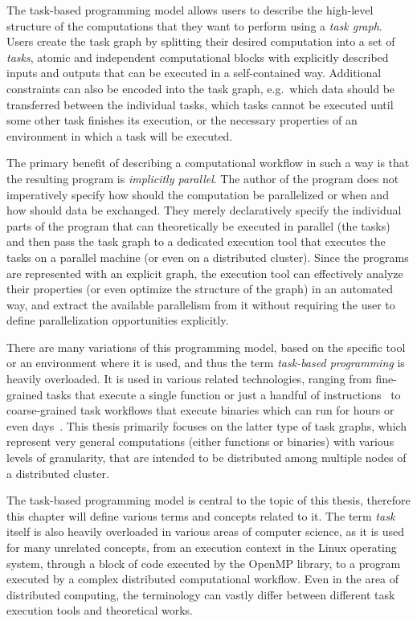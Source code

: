
The task-based programming model allows users to describe the high-level structure of the
computations that they want to perform using a \emph{task graph}. Users create the task graph
by splitting their desired computation into a set of \emph{tasks}, atomic and independent
computational blocks with explicitly described inputs and outputs that can be executed in a
self-contained way. Additional constraints can also be encoded into the task graph, e.g.\ which
data should be transferred between the individual tasks, which tasks cannot be executed until some
other task finishes its execution, or the necessary properties of an environment in which a task
will be executed.

The primary benefit of describing a computational workflow in such a way is that the resulting
program is \emph{implicitly parallel}. The author of the program does not imperatively specify how
should the computation be parallelized or when and how should data be exchanged. They merely
declaratively specify the individual parts of the program that can theoretically be executed in
parallel (the tasks) and then pass the task graph to a dedicated execution tool that executes the
tasks on a parallel machine (or even on a distributed cluster). Since the programs are represented
with an explicit graph, the execution tool can effectively analyze their properties (or even
optimize the structure of the graph) in an automated way, and extract the available parallelism
from it without requiring the user to define parallelization opportunities explicitly.

There are many variations of this programming model, based on the specific tool or an environment
where it is used, and thus the term \emph{task-based programming} is heavily overloaded. It is used in
various related technologies, ranging from fine-grained tasks that execute a single function or
just a handful of instructions~\cite{starpu,openmp} to coarse-grained task workflows that execute
binaries which can run for hours or even days~\cite{dask, snakemake, nextflow}. This thesis primarily focuses
on the latter type of task graphs, which represent very general computations (either functions or
binaries) with various levels of granularity, that are intended to be distributed among multiple
nodes of a distributed cluster.

The task-based programming model is central to the topic of this thesis, therefore this chapter
will define various terms and concepts related to it. The term \emph{task} itself is
also heavily overloaded in various areas of computer science, as it is used for many unrelated
concepts, from an execution context in the Linux operating system, through a block of code executed
by the OpenMP library, to a program executed by a complex distributed computational workflow. Even
in the area of distributed computing, the terminology can vastly differ between different task
execution tools and theoretical works.

